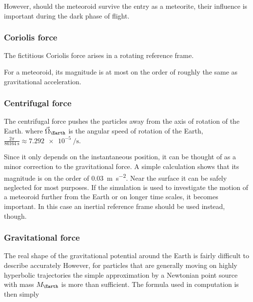         However, should the meteoroid survive the entry as a meteorite, their influence is important during the dark phase of flight.

        \subsubsection{Coriolis force} \label{saiC}
            The fictitious Coriolis force arises in a rotating reference frame.

            For a meteoroid, its magnitude is at most on the order of
            roughly the same as gravitational acceleration.

        \subsubsection{Centrifugal force} \label{saic}
            The centrifugal force pushes the particles away from the axis of rotation of the Earth.
            where $\vec{\Omega}_\Earth$ is the angular speed of rotation of the Earth,
            $\frac{2\pi}{\SI{86164}{\second}} \approx \SI{7.292e-5}{\per\second}$.

            Since it only depends on the instantaneous position, it can be thought of as a minor correction to the
            gravitational force. A simple calculation shows that its magnitude is on the order
            of \SI{0.03}{\metre\per\second\squared}. Near the surface it can be safely neglected for most purposes.
            If the simulation is used to investigate the motion of a meteoroid further from the Earth or
            on longer time scales, it becomes important.
            In this case an inertial reference frame should be used instead, though.

        \subsubsection{Gravitational force} \label{saig}
            The real shape of the gravitational potential around the Earth is fairly difficult to describe accurately
            However, for particles that are generally moving on highly hyperbolic trajectories the
            simple approximation by a Newtonian point source with mass $M_\Earth$ is more than sufficient.
            The formula used in computation is then simply

